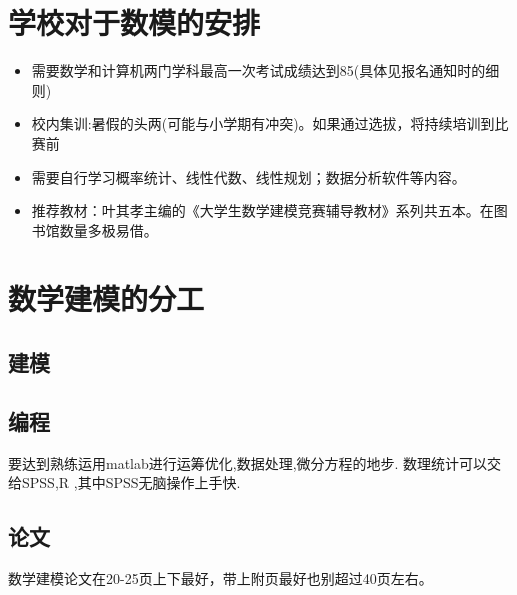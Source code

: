 \documentclass[11pt, a4paper, UTF8]{ctexart}
\begin{document}
\section{学校对于数模的安排}
\begin{itemize}
\item 需要数学和计算机两门学科最高一次考试成绩达到85(具体见报名通知时的细则)
\item 校内集训:暑假的头两(可能与小学期有冲突)。如果通过选拔，将持续培训到比赛前
\item 需要自行学习概率统计、线性代数、线性规划；数据分析软件等内容。
\item 推荐教材：叶其孝主编的《大学生数学建模竞赛辅导教材》系列共五本。在图书馆数量多极易借。
\end{itemize}




\section{数学建模的分工}
\subsection{建模}

\subsection{编程}
要达到熟练运用matlab进行运筹优化,数据处理,微分方程的地步. 数理统计可以交给SPSS,R ,其中SPSS无脑操作上手快.
\subsection{论文}
数学建模论文在20-25页上下最好，带上附页最好也别超过40页左右。
\end{document}
